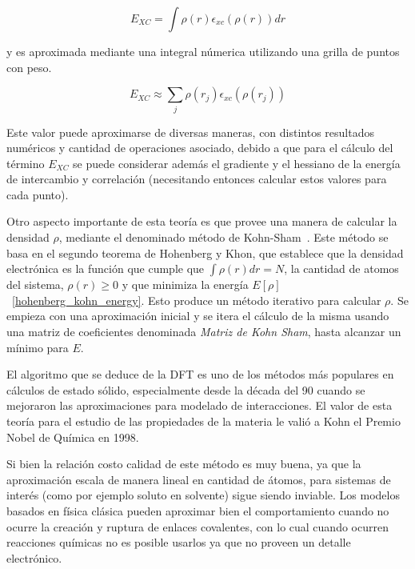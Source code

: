 \begin{equation}
    E_{XC} = \int \rho(r) \epsilon_{xc}\left( \rho(r) \right ) dr
\end{equation}

y es aproximada mediante una integral n\'umerica utilizando una grilla de puntos con peso.

\begin{equation}
    \label{approx_excenergy}
    E_{XC} \approx \sum_j \rho(r_j) \epsilon_{xc} (\rho(r_j))
\end{equation}

Este valor puede aproximarse de diversas maneras, con distintos resultados num\'ericos y cantidad de operaciones
asociado, debido a que para el c\'alculo del t\'ermino $E_{XC}$ se puede considerar adem\'as el gradiente
y el hessiano de la energ\'ia de intercambio y correlaci\'on (necesitando entonces calcular
estos valores para cada punto).

Otro aspecto importante de esta teor\'ia es que provee una manera de calcular la densidad $\rho$,
mediante el denominado m\'etodo de Kohn-Sham~\cite{KohnSham}. Este m\'etodo se basa en el segundo teorema
de Hohenberg y Khon, que establece que la densidad electr\'onica es la funci\'on que
cumple que $\int \rho(r) dr = N$, la cantidad de atomos del sistema, $\rho(r) \geq 0$ y que
minimiza la energ\'ia $E[\rho]$~\ref{hohenberg_kohn_energy}. Esto produce
un m\'etodo iterativo para calcular $\rho$. Se empieza con una aproximaci\'on inicial y
se itera el c\'alculo de la misma usando una matriz de coeficientes denominada \textit{Matriz de Kohn Sham}, hasta
alcanzar un m\'inimo para $E$.

El algoritmo que se deduce de la DFT es uno de los m\'etodos m\'as populares en c\'alculos
de estado s\'olido, especialmente desde la d\'ecada del 90 cuando se mejoraron las aproximaciones para modelado de
interacciones. El valor de esta teor\'ia para el estudio de las propiedades de la materia le vali\'o a Kohn el Premio Nobel
de Qu\'imica en 1998.

Si bien la relaci\'on costo calidad de este m\'etodo es muy buena, ya que la aproximaci\'on escala de manera lineal
en cantidad de \'atomos, para sistemas de inter\'es (como por ejemplo soluto en solvente) sigue siendo inviable. Los
modelos basados en f\'isica cl\'asica pueden aproximar bien el comportamiento cuando no ocurre la creaci\'on y ruptura
de enlaces covalentes, con lo cual cuando ocurren reacciones qu\'imicas no es posible usarlos ya que no proveen un
detalle electr\'onico.

